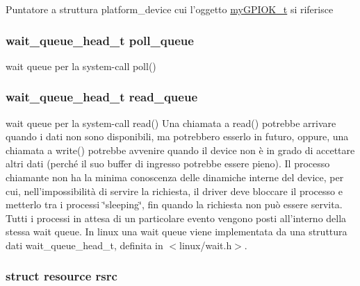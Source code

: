 Puntatore a struttura platform\+\_\+device cui l'oggetto \hyperlink{structmy_g_p_i_o_k__t}{my\+G\+P\+I\+O\+K\+\_\+t} si riferisce \hypertarget{structmy_g_p_i_o_k__t_a2080617f88cafd765430573afe7701d1}{
\subsubsection[{poll\+\_\+queue}]{\setlength{\rightskip}{0pt plus 5cm}wait\+\_\+queue\+\_\+head\+\_\+t poll\+\_\+queue}}\label{structmy_g_p_i_o_k__t_a2080617f88cafd765430573afe7701d1}
wait queue per la system-\/call poll() \hypertarget{structmy_g_p_i_o_k__t_a251570f8e6976ad87411093e330e7b4f}{
\subsubsection[{read\+\_\+queue}]{\setlength{\rightskip}{0pt plus 5cm}wait\+\_\+queue\+\_\+head\+\_\+t read\+\_\+queue}}\label{structmy_g_p_i_o_k__t_a251570f8e6976ad87411093e330e7b4f}
wait queue per la system-\/call read() Una chiamata a read() potrebbe arrivare quando i dati non sono disponibili, ma potrebbero esserlo in futuro, oppure, una chiamata a write() potrebbe avvenire quando il device non è in grado di accettare altri dati (perché il suo buffer di ingresso potrebbe essere pieno). Il processo chiamante non ha la minima conoscenza delle dinamiche interne del device, per cui, nell'impossibilità di servire la richiesta, il driver deve bloccare il processo e metterlo tra i processi \char`\"{}sleeping\char`\"{}, fin quando la richiesta non può essere servita. Tutti i processi in attesa di un particolare evento vengono posti all'interno della stessa wait queue. In linux una wait queue viene implementata da una struttura dati wait\+\_\+queue\+\_\+head\+\_\+t, definita in $<$linux/wait.\+h$>$. \hypertarget{structmy_g_p_i_o_k__t_a565a1848c3ae8026257a74cf169c6941}{
\subsubsection[{rsrc}]{\setlength{\rightskip}{0pt plus 5cm}struct resource rsrc}}\label{structmy_g_p_i_o_k__t_a565a1848c3ae8026257a74cf169c6941}
